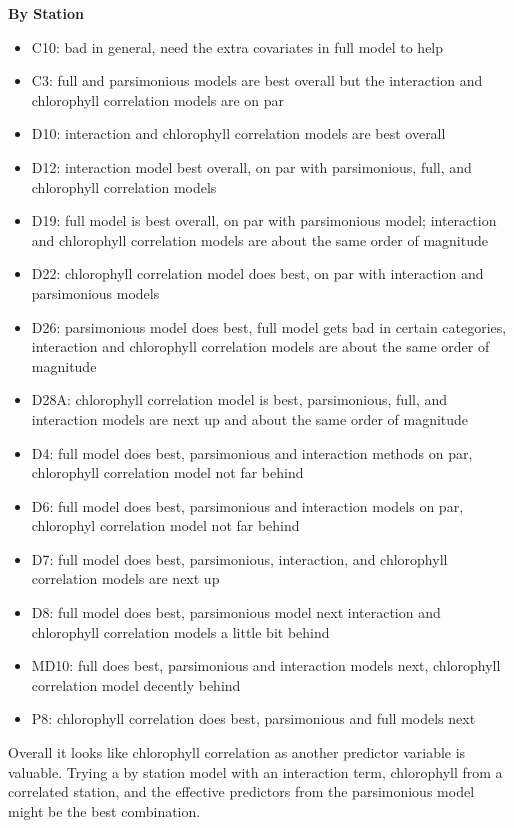 \documentclass[12pt]{amsart}
\begin{document}
\textbf{By Station}
\begin{itemize}
\item C10: bad in general, need the extra covariates in full model to help
\item C3: full and parsimonious models are best overall but the interaction and chlorophyll correlation models are on par
\item D10: interaction and chlorophyll correlation models are best overall
\item D12: interaction model best overall, on par with parsimonious, full, and chlorophyll correlation models
\item D19: full model is best overall, on par with parsimonious model; interaction and chlorophyll correlation models are about the same order of magnitude
\item D22: chlorophyll correlation model does best, on par with interaction and parsimonious models
\item D26: parsimonious model does best, full model gets bad in certain categories, interaction and chlorophyll correlation models are about the same order of magnitude
\item D28A: chlorophyll correlation model is best, parsimonious, full, and interaction models are next up and about the same order of magnitude
\item D4: full model does best, parsimonious and interaction methods on par, chlorophyll correlation model not far behind
\item D6: full model does best, parsimonious and interaction models on par, chlorophyl correlation model not far behind
\item D7: full model does best, parsimonious, interaction, and chlorophyll correlation models are next up
\item D8: full model does best, parsimonious model next interaction and chlorophyll correlation models a little bit behind
\item MD10: full does best, parsimonious and interaction models next, chlorophyll correlation model decently behind
\item P8: chlorophyll correlation does best, parsimonious and full models next
\end{itemize}

Overall it looks like chlorophyll correlation as another predictor variable is valuable. Trying a by station model with an interaction term, chlorophyll from a correlated station, and the effective predictors from the parsimonious model might be the best combination.
\end{document}
